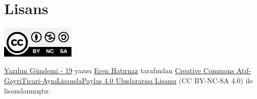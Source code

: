 \documentclass[11pt]{article}
\begin{document}
\section{Lisans}
\label{sec:org3a4f8ca}
\begin{center}
\begin{center}
\includegraphics[height=1.5cm]{../../../img/CC_BY-NC-SA_4.0.png}
\end{center}

\href{yazilim-gundemi-19.pdf}{Yazılım Gündemi - 19} yazısı \href{https://erenhatirnaz.github.io}{Eren Hatırnaz} tarafından \href{http://creativecommons.org/licenses/by-nc-sa/4.0/}{Creative Commons
Atıf-GayriTicari-AynıLisanslaPaylaş 4.0 Uluslararası Lisansı} (CC BY-NC-SA 4.0)
ile lisanslanmıştır.
\end{center}
\end{document}
